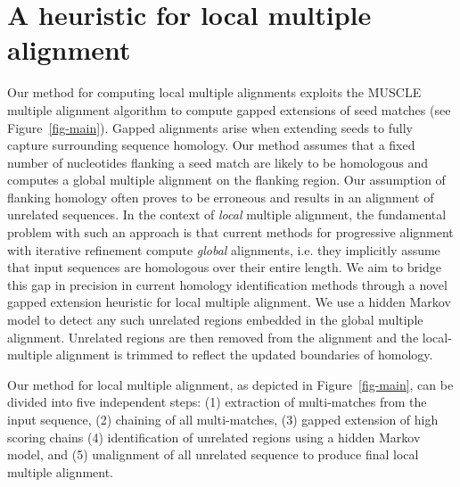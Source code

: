 \documentclass{ws-procs975x65}
\begin{document}
\section{A heuristic for local multiple alignment}
Our method for computing local multiple alignments exploits the MUSCLE multiple alignment algorithm to compute gapped extensions of seed matches (see Figure~\ref{fig-main}). Gapped alignments arise when extending seeds to fully capture surrounding sequence homology. Our method assumes that a fixed number of nucleotides flanking a seed match are likely to be homologous and computes a global multiple alignment on the flanking region.  Our assumption of flanking homology often proves to be erroneous and results in an alignment of unrelated sequences.  In the context of \textit{local} multiple alignment, the fundamental problem with such an approach is that current methods for progressive alignment with iterative refinement compute \textit{global} alignments, i.e. they implicitly assume that input sequences are homologous over their entire length. We aim to bridge this gap in precision in current homology identification methods through a novel gapped extension heuristic for local multiple alignment. We use a hidden Markov model to detect any such unrelated regions embedded in the global multiple alignment.  Unrelated regions are then removed from the alignment and the local-multiple alignment is trimmed to reflect the updated boundaries of homology.

Our method for local multiple alignment, as depicted in Figure~\ref{fig-main},
can be divided into five independent steps: (1) extraction of multi-matches from the input sequence, (2) chaining of all multi-matches, (3) gapped extension of high scoring chains (4) identification of unrelated regions using a hidden Markov model, and (5) unalignment of all unrelated sequence to produce final local multiple alignment.
\end{document}

